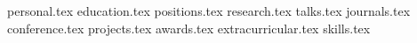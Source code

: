 \documentclass[margin,line]{res}
\newcommand*{\sectiondir}{sections/}
\begin{document}

\begin{resume}

{personal.tex}
{education.tex}
{positions.tex}
{research.tex}
{talks.tex}
{journals.tex}
{conference.tex}
{projects.tex}
{awards.tex}
{extracurricular.tex}
{skills.tex}

\end{resume}
\end{document}
